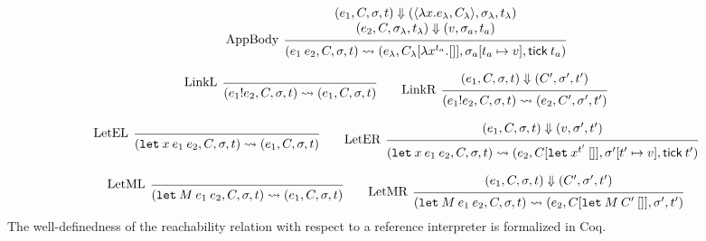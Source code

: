\documentclass{article}
\theoremstyle{definition}
\newcommand*{\link}[2]{{#1}\mathtt{!}{#2}}
\newcommand*{\tick}{\mathsf{tick}}
\begin{document}
\[
  \begin{prooftree}
    \hypo{
      \begin{matrix}
        (e_{1}, C, \sigma, t)
        \Downarrow
        (\langle\lambda x.e_{\lambda}, C_{\lambda}\rangle, \sigma_{\lambda}, t_{\lambda}) \\
        (e_{2}, C, \sigma_{\lambda}, t_{\lambda})
        \Downarrow
        (v, \sigma_{a}, t_{a})
      \end{matrix}
    }
    \infer[left label={AppBody}]1{
    (e_{1}\:e_{2}, C, \sigma, t)
    \rightsquigarrow
    (e_{\lambda}, C_{\lambda}[\lambda x^{t_{a}}.[]], \sigma_{a}[t_{a}\mapsto v], \tick\:t_{a})
    }
  \end{prooftree}
\]

\[
  \begin{prooftree}
    \infer[left label=LinkL]0{
    (\link{e_{1}}{e_{2}}, C, \sigma, t)
    \rightsquigarrow
    (e_{1}, C, \sigma, t)
    }
  \end{prooftree}\qquad
  \begin{prooftree}
    \hypo{
      \begin{matrix}
        (e_{1}, C, \sigma, t)
        \Downarrow
        (C', \sigma', t')
      \end{matrix}
    }
    \infer[left label=LinkR]1{
    (\link{e_{1}}{e_{2}}, C, \sigma, t)
    \rightsquigarrow
    (e_{2}, C', \sigma', t')
    }
  \end{prooftree}
\]

\[
  \begin{prooftree}
    \infer[left label=LetEL]0{
    (\mathtt{let}\:x\:e_1\:e_2, C, \sigma, t)
    \rightsquigarrow
    (e_{1}, C, \sigma, t)
    }
  \end{prooftree}\qquad
  \begin{prooftree}
    \hypo{
      \begin{matrix}
        (e_{1}, C, \sigma, t)
        \Downarrow
        (v, \sigma', t')
      \end{matrix}
    }
    \infer[left label=LetER]1{
    (\mathtt{let}\:x\:e_1\:e_2, C, \sigma, t)
    \rightsquigarrow
    (e_{2}, C[\mathtt{let}\:x^{t'}\:[]], \sigma'[t'\mapsto v], \tick\:t')
    }
  \end{prooftree}
\]

\[
  \begin{prooftree}
    \infer[left label=LetML]0{
    (\mathtt{let}\:M\:e_{1}\:e_{2}, C, \sigma, t)
    \rightsquigarrow
    (e_{1}, C, \sigma, t)
    }
  \end{prooftree}\qquad
  \begin{prooftree}
    \hypo{
      \begin{matrix}
        (e_{1}, C, \sigma, t)
        \Downarrow
        (C', \sigma', t')
      \end{matrix}
    }
    \infer[left label=LetMR]1{
    (\mathtt{let}\:M\:e_{1}\:e_{2}, C, \sigma, t)
    \rightsquigarrow
    (e_{2}, C[\mathtt{let}\:M\:C'\:[]], \sigma', t')
    }
  \end{prooftree}
\]
The well-definedness of the reachability relation with respect to a reference interpreter is formalized in Coq.
\end{document}
